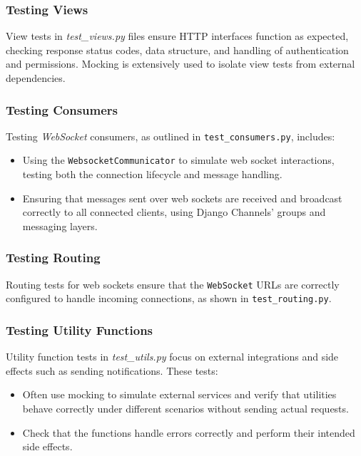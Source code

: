 \subsubsection{Testing Views}

View tests in \textit{test\_views.py} files ensure HTTP interfaces function as expected, checking response status codes, data structure, and handling of authentication and permissions. Mocking is extensively used to isolate view tests from external dependencies.

\subsubsection{Testing Consumers}

Testing \textit{WebSocket} consumers, as outlined in \texttt{test\_consumers.py}, includes:

\begin{itemize}
    \item Using the \texttt{WebsocketCommunicator} to simulate web socket interactions, testing both the connection lifecycle and message handling.
    \item Ensuring that messages sent over web sockets are received and broadcast correctly to all connected clients, using Django Channels' groups and messaging layers.
\end{itemize}

\subsubsection{Testing Routing}

Routing tests for web sockets ensure that the \texttt{WebSocket} URLs are correctly configured to handle incoming connections, as shown in \texttt{test\_routing.py}.

\subsubsection{Testing Utility Functions}

Utility function tests in \textit{test\_utils.py} focus on external integrations and side effects such as sending notifications. These tests:

\begin{itemize}
    \item Often use mocking to simulate external services and verify that utilities behave correctly under different scenarios without sending actual requests.
    \item Check that the functions handle errors correctly and perform their intended side effects.
\end{itemize}

